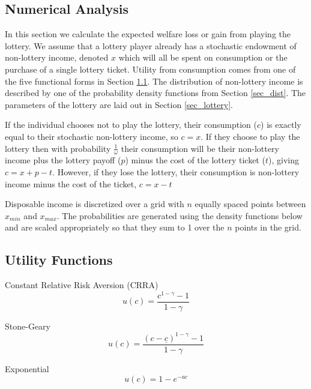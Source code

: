 \documentclass[letterpaper,12pt]{article}
\numberwithin{equation}{section}
\numberwithin{figure}{section}
\numberwithin{table}{section}
\begin{document}
\begin{spacing}{1.5}
\section{Numerical Analysis} \label{sec_numer}

	In this section we calculate the expected welfare loss or gain from playing the lottery.  We assume that a lottery player already has a stochastic endowment of non-lottery income, denoted $x$ which will all be spent on consumption or the purchase of a single lottery ticket.  Utility from consumption comes from one of the five functional forms in Section \ref{sec_util}.  The distribution of non-lottery income is described by one of the probability density functions from Section \ref{sec_dist}.  The parameters of the lottery are laid out in Section \ref{sec_lottery}.

	If the individual chooses not to play the lottery, their consumption ($c$) is exactly equal to their stochastic non-lottery income, so $c = x$.  If they choose to play the lottery then with probability $\tfrac{1}{\omega}$ their consumption will be their non-lottery income plus the lottery payoff ($p$) minus the cost of the lottery ticket ($t$), giving $c = x + p - t$.  However, if they lose the lottery, their consumption is non-lottery income minus the cost of the ticket, $c = x - t$

	Disposable income is discretized over a grid with $n$ equally spaced points between $x_{min}$ and $x_{max}$.  The probabilities are generated using the density functions below and are scaled appropriately so that they sum to 1 over the $n$ points in the grid.


	\subsection{Utility Functions} \label{sec_util}

		Constant Relative Risk Aversion (CRRA)
		\begin{equation}
			u(c) = \frac{c^{1-\gamma}-1}{1-\gamma}
		\end{equation}

		Stone-Geary
		\begin{equation}
			u(c) = \frac{(c-\underline{c})^{1-\gamma}-1}{1-\gamma}
		\end{equation}

		Exponential
		\begin{equation}
			u(c) = 1-e^{-a c}
		\end{equation}


\end{spacing}
\end{document}
